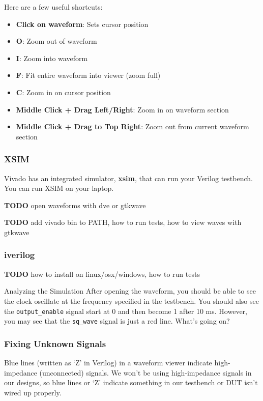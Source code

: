 \documentclass[11pt]{article}
\makeatletter
\renewcommand{\subsection}
{\@startsection {subsection}{1}{0pt}
 {-1ex}
 {0.5ex}
 {\bfseries\normalsize}}
\makeatother
\begin{document}
Here are a few useful shortcuts:

\begin{itemize}
  \item \textbf{Click on waveform}: Sets cursor position
  \item \textbf{O}: Zoom out of waveform
  \item \textbf{I}: Zoom into waveform
  \item \textbf{F}: Fit entire waveform into viewer (zoom full)
  \item \textbf{C}: Zoom in on cursor position
  \item \textbf{Middle Click + Drag Left/Right}: Zoom in on waveform section
  \item \textbf{Middle Click + Drag to Top Right}: Zoom out from current waveform section
\end{itemize}

\subsubsection{XSIM}
Vivado has an integrated simulator, \textbf{xsim}, that can run your Verilog testbench.
You can run XSIM on your laptop.

\textbf{TODO} open waveforms with dve or gtkwave

\textbf{TODO} add vivado bin to PATH, how to run tests, how to view waves with gtkwave

\subsubsection{iverilog}
\textbf{TODO} how to install on linux/osx/windows, how to run tests

\subsection{Analyzing the Simulation}
After opening the waveform, you should be able to see the clock oscillate at the frequency specified in the testbench.
You should also see the \verb|output_enable| signal start at 0 and then become 1 after 10 ms.
However, you may see that the \verb|sq_wave| signal is just a red line. What's going on?

\subsubsection{Fixing Unknown Signals}
Blue lines (written as `Z' in Verilog) in a waveform viewer indicate high-impedance (unconnected) signals.
We won't be using high-impedance signals in our designs, so blue lines or `Z' indicate something in our testbench or DUT isn't wired up properly.
\end{document}
